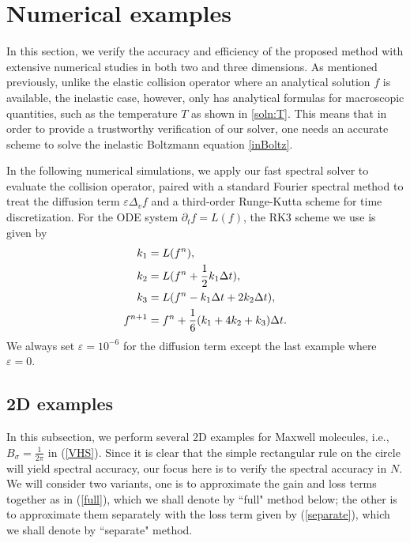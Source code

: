 \documentclass[review,times]{elsarticle}
\begin{document}
\section{Numerical examples}

In this section, we verify the accuracy and efficiency of the proposed method with extensive numerical studies in both two and three dimensions. As mentioned previously, unlike the elastic collision operator where an analytical solution $f$ is available, the inelastic case, however, only has analytical formulas for macroscopic quantities, such as the temperature $T$ as shown in \eqref{soln:T}. This means that in order to provide a trustworthy verification of our solver, one needs an accurate scheme to solve the inelastic Boltzmann equation \eqref{inBoltz}.

In the following numerical simulations, we apply our fast spectral solver to evaluate the collision operator, paired with a standard Fourier spectral method to treat the diffusion term $\varepsilon\Delta_v f$ and a third-order Runge-Kutta scheme for time discretization. For the ODE system $\partial_t f=L(f)$, the RK3 scheme we use is given by
\begin{align}
  k_1 &= L(f^n), \notag \\
  k_2 &= L(f^n + \frac{1}{2}k_1\Delta t), \notag \\
  k_3 &= L(f^n - k_1\Delta t + 2k_2\Delta t), \notag \\
  f^{n+1} &= f^n + \frac{1}{6}(k_1 + 4k_2 + k_3)\Delta t.
\end{align}
We always set $\varepsilon=10^{-6}$ for the diffusion term except the last example where $\varepsilon=0$.

\subsection{2D examples}

In this subsection, we perform several 2D examples for Maxwell molecules, i.e., $B_{\sigma}=\frac{1}{2\pi}$ in (\ref{VHS}). Since it is clear that the simple rectangular rule on the circle will yield spectral accuracy, our focus here is to verify the spectral accuracy in $N$. We will consider two variants, one is to approximate the gain and loss terms together as in (\ref{full}), which we shall denote by ``full" method below; the other is to approximate them separately with the loss term given by (\ref{separate}), which we shall denote by ``separate" method.
\end{document}
